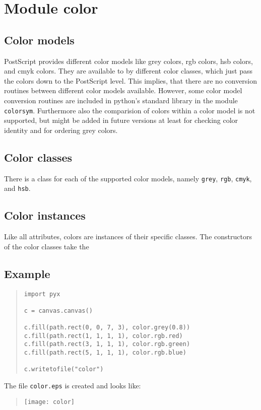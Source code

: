 \chapter{Module color}
\label{color}
\section{Color models}
PostScript provides different color models like grey colors, rgb
colors, hsb colors, and cmyk colors. They are available to \PyX{} by
different color classes, which just pass the colors down to the
PostScript level. This implies, that there are no conversion routines
between different color models available. However, some color model
conversion routines are included in python's standard library in the
module \texttt{colorsym}. Furthermore also the comparision of colors
within a color model is not supported, but might be added in future
versions at least for checking color identity and for ordering grey
colors.

\section{Color classes}
There is a class for each of the supported color models, namely
\verb|grey|, \verb|rgb|, \verb|cmyk|, and \verb|hsb|.

\section{Color instances}
Like all attributes, colors are instances of their specific classes.
The constructors of the color classes take the 

\section{Example}
\begin{quote}
\begin{verbatim}
import pyx

c = canvas.canvas()

c.fill(path.rect(0, 0, 7, 3), color.grey(0.8))
c.fill(path.rect(1, 1, 1, 1), color.rgb.red)
c.fill(path.rect(3, 1, 1, 1), color.rgb.green)
c.fill(path.rect(5, 1, 1, 1), color.rgb.blue)

c.writetofile("color")
\end{verbatim}
\end{quote}

The file \verb|color.eps| is created and looks like:
\begin{quote}
\texttt{[image: color]}
\end{quote}
